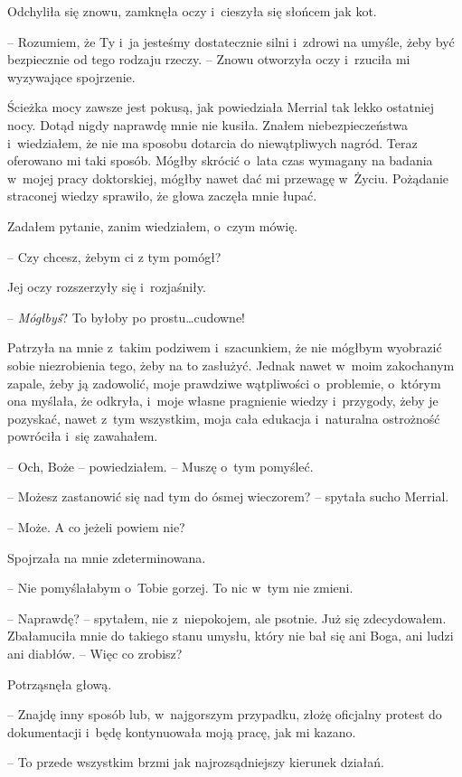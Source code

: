 \documentclass[oneside,polish,11pt,sfheadings]{mwbk}
\begin{document}
Odchyliła się znowu, zamknęła oczy i~cieszyła się słońcem jak kot. 

-- Rozumiem, że Ty i~ja jesteśmy dostatecznie silni i~zdrowi na umyśle,
żeby być bezpiecznie od tego rodzaju rzeczy. -- Znowu otworzyła oczy i~rzuciła mi wyzywające spojrzenie.

Ścieżka mocy zawsze jest pokusą, jak powiedziała Merrial tak lekko
ostatniej nocy. Dotąd nigdy naprawdę mnie nie kusiła. Znałem
niebezpieczeństwa i~wiedziałem, że nie ma sposobu dotarcia do
niewątpliwych nagród. Teraz oferowano mi taki sposób. Mógłby skrócić o~lata czas wymagany na badania w~mojej pracy doktorskiej, mógłby nawet
dać mi przewagę w~Życiu. Pożądanie straconej wiedzy sprawiło, że głowa
zaczęła mnie łupać.

Zadałem pytanie, zanim wiedziałem, o~czym mówię. 

-- Czy chcesz, żebym ci
z tym pomógł?

Jej oczy rozszerzyły się i~rozjaśniły. 

-- \textit{Mógłbyś}? To byłoby po
prostu\ldots cudowne!

Patrzyła na mnie z~takim podziwem i~szacunkiem, że nie mógłbym wyobrazić
sobie niezrobienia tego, żeby na to zasłużyć. Jednak nawet w~moim
zakochanym zapale, żeby ją zadowolić, moje prawdziwe wątpliwości o~problemie, o~którym ona myślała, że odkryła, i~moje własne pragnienie
wiedzy i~przygody, żeby je pozyskać, nawet z~tym wszystkim, moja cała
edukacja i~naturalna ostrożność powróciła i~się zawahałem.

-- Och, Boże -- powiedziałem. -- Muszę o~tym pomyśleć.

-- Możesz zastanowić się nad tym do ósmej wieczorem? -- spytała sucho
Merrial.

-- Może. A co jeżeli powiem nie?

Spojrzała na mnie zdeterminowana. 

-- Nie pomyślałabym o~Tobie gorzej. To
nic w~tym nie zmieni.

-- Naprawdę? -- spytałem, nie z~niepokojem, ale psotnie. Już się
zdecydowałem. Zbałamuciła mnie do takiego stanu umysłu, który nie bał
się ani Boga, ani ludzi ani diabłów. -- Więc co zrobisz?

Potrząsnęła głową. 

-- Znajdę inny sposób lub, w~najgorszym przypadku,
złożę oficjalny protest do dokumentacji i~będę kontynuowała moją pracę,
jak mi kazano.

-- To przede wszystkim brzmi jak najrozsądniejszy kierunek działań.
\end{document}
